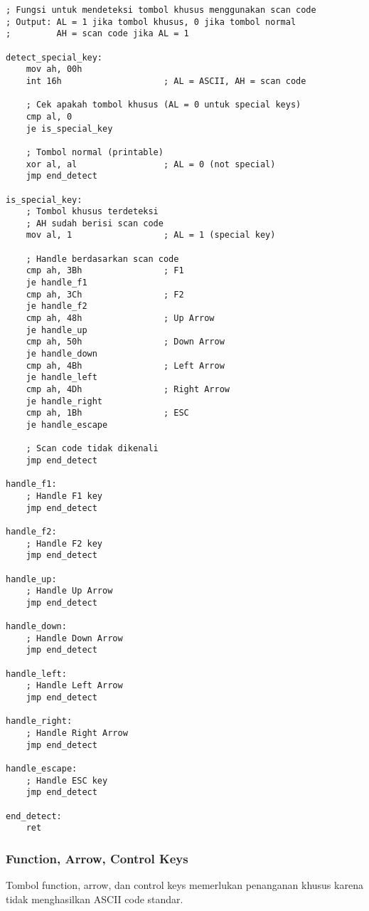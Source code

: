\documentclass[../main.tex]{subfiles}
\begin{document}
\begin{lstlisting}[language={[x86masm]Assembler}, caption=Deteksi Tombol Khusus dengan Scan Code, label={lst:special-keys}]
; Fungsi untuk mendeteksi tombol khusus menggunakan scan code
; Output: AL = 1 jika tombol khusus, 0 jika tombol normal
;         AH = scan code jika AL = 1

detect_special_key:
    mov ah, 00h
    int 16h                    ; AL = ASCII, AH = scan code
    
    ; Cek apakah tombol khusus (AL = 0 untuk special keys)
    cmp al, 0
    je is_special_key
    
    ; Tombol normal (printable)
    xor al, al                 ; AL = 0 (not special)
    jmp end_detect
    
is_special_key:
    ; Tombol khusus terdeteksi
    ; AH sudah berisi scan code
    mov al, 1                  ; AL = 1 (special key)
    
    ; Handle berdasarkan scan code
    cmp ah, 3Bh                ; F1
    je handle_f1
    cmp ah, 3Ch                ; F2
    je handle_f2
    cmp ah, 48h                ; Up Arrow
    je handle_up
    cmp ah, 50h                ; Down Arrow
    je handle_down
    cmp ah, 4Bh                ; Left Arrow
    je handle_left
    cmp ah, 4Dh                ; Right Arrow
    je handle_right
    cmp ah, 1Bh                ; ESC
    je handle_escape
    
    ; Scan code tidak dikenali
    jmp end_detect
    
handle_f1:
    ; Handle F1 key
    jmp end_detect
    
handle_f2:
    ; Handle F2 key
    jmp end_detect
    
handle_up:
    ; Handle Up Arrow
    jmp end_detect
    
handle_down:
    ; Handle Down Arrow
    jmp end_detect
    
handle_left:
    ; Handle Left Arrow
    jmp end_detect
    
handle_right:
    ; Handle Right Arrow
    jmp end_detect
    
handle_escape:
    ; Handle ESC key
    jmp end_detect
    
end_detect:
    ret
\end{lstlisting}

            \subsubsection{Function, Arrow, Control Keys}
Tombol function, arrow, dan control keys memerlukan penanganan khusus karena tidak menghasilkan ASCII code standar.
\end{document}
